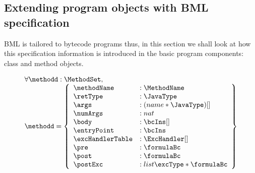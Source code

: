 
\subsection{Extending program objects with BML specification} \label{extend}

BML is tailored to bytecode programs thus, in this section we shall 
look at how this specification information is introduced in the basic
 program components: class and method objects.



 $$ \begin{array}{l}  \forall \methodd: \MethodSet, \\
                                                          \methodd  = \left\{\begin{array}{ll}  \methodName & :\MethodName\\
							  \retType      & :\JavaType\\
							  \args	        &  : (name * \JavaType) [] \\
							  \numArgs	& : nat \\
							  \body	        &  : \bcIns [] \\
							  \entryPoint   &  : \bcIns\\
							  \excHandlerTable & : \ExcHandler [] \\
							  \pre & : \formulaBc  \\
							  \post  & : \formulaBc  \\
							  \postExc  & : list \excType * \formulaBc 
								   
                                     \end{array}  \right\}
     \end{array} $$
  
